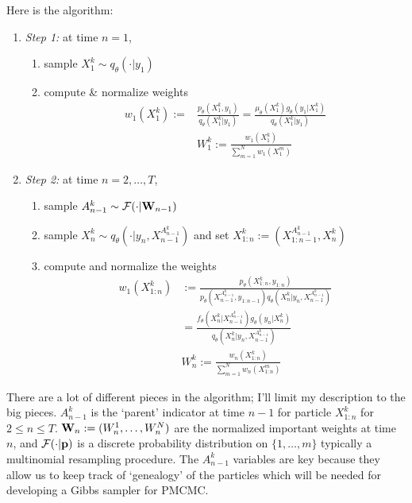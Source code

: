 \documentclass{article}\usepackage[]{graphicx}\usepackage[]{color}
\theoremstyle{definition}
\begin{document}
Here is the algorithm:
\begin{enumerate}
  \item[] \textit{Step 1:} at time $n=1$,
  \begin{enumerate}
    \item sample $X^k_1 \sim q_\theta(\cdot|y_1)$
    \item compute \& normalize weights
    \begin{align}
      w_1(X^k_1) :=& \frac{p_\theta(X^k_1, y_1)}{q_\theta(X^k_1 | y_1)} = \frac{\mu_\theta(X^k_1) g_\theta(y_1|X^k_1)}{q_\theta(X^k_1 | y_1)} \nonumber \\
      & W_1^k := \frac{w_1(X_1^k)}{\sum \limits_{m=1}^N w_1(X^m_1)}
    \end{align}
  \end{enumerate}
%
%
  \item[] \textit{Step 2:} at time $n=2,\ldots,T$,
  \begin{enumerate}
    \item sample $A^k_{n-1} \sim \mathcal{F}(\cdot | {\bf W}_{n-1})$
    \item sample $X^k_n \sim q_\theta(\cdot|y_n, X_{n-1}^{A^k_{n-1}})$ and set $X_{1:n}^k := (X_{1:n-1}^{A^k_{n-1}}, X^k_n)$
    \item compute and normalize the weights
    \begin{align}
      w_1(X^k_{1:n}) &:= \frac{p_\theta(X^k_{1:n}, y_{1:n})}{p_\theta(X_{n-1}^{A^k_{n-1}}, y_{1:n-1}) q_\theta(X^k_n|y_n, X_{n-1}^{A^k_{n-1}})} \nonumber \\
                  &= \frac{f_\theta(X^k_n | X_{n-1}^{A^k_{n-1}}) g_\theta(y_n | X^k_n)}{q_\theta(X^k_n | y_n, X_{n-1}^{A^k_{n-1}})} \nonumber \\
      & W_n^k := \frac{w_n(X_{1:n}^k)}{\sum \limits_{m=1}^N w_n(X^m_{1:n})}
    \end{align}
  \end{enumerate}
\end{enumerate}

There are a lot of different pieces in the algorithm; I'll limit my description to the big pieces. $A^k_{n-1}$ is the `parent' indicator at time $n-1$ for particle $X_{1:n}^k$ for $2 \leq n \leq T$. ${\bf W}_n := (W^1_n,\ldots,W_n^N)$ are the normalized important weights at time $n$, and $\mathcal{F}(\cdot | {\bf p})$ is a discrete probability distribution on $\{ 1,\ldots, m \}$ typically a multinomial resampling procedure. The $A^k_{n-1}$ variables are key because they allow us to keep track of `genealogy' of the particles which will be needed for developing a Gibbs sampler for PMCMC. 
\end{document}
